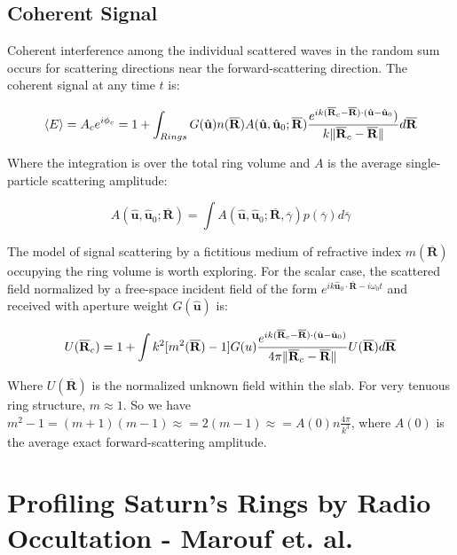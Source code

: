 \documentclass[oneside]{book}
\theoremstyle{mystyle}
\DeclarePairedDelimiter\norm{\lVert}{\rVert}
\begin{document}
\subsection{Coherent Signal}

Coherent interference among the individual scattered waves in the random sum occurs for scattering directions near the forward-scattering direction. The coherent signal at any time $t$ is:

\begin{equation}
\langle E \rangle = A_{c}e^{i\phi_{c}} = 1+\int_{Rings}G(\hat{\mathbf{u}})n(\overline{\mathbf{R}})A(\hat{\mathbf{u}},\hat{\mathbf{u}}_{0};\overline{\mathbf{R}})\frac{e^{ik(\overline{\mathbf{R}}_{c}-\overline{\mathbf{R}})\cdot(\hat{\mathbf{u}}-\hat{\mathbf{u}}_{0}})}{k\norm{\overline{\mathbf{R}}_{c}-\overline{\mathbf{R}}}}d\overline{\mathbf{R}}
\end{equation}

Where the integration is over the total ring volume and $A$ is the average single-particle scattering amplitude:

\begin{equation}
A(\hat{\mathbf{u}},\hat{\mathbf{u}}_{0};\overline{\mathbf{R}}) = \int A(\hat{\mathbf{u}},\hat{\mathbf{u}}_{0};\overline{\mathbf{R}},\overline{\gamma})p(\overline{\gamma})d\overline{\gamma}
\end{equation}

The model of signal scattering by a fictitious medium of refractive index $m(\overline{\mathbf{R}})$ occupying the ring volume is worth exploring. For the scalar case, the scattered field normalized by a free-space incident field of the form $e^{ik\hat{\mathbf{u}}_{0}\cdot \overline{\mathbf{R}}-i\omega_{0}t}$ and received with aperture weight $G(\hat{\mathbf{u}})$ is:

\begin{equation}
U(\overline{\mathbf{R}}_{c}) = 1+\int k^2[m^2(\overline{\mathbf{R}}) - 1]G(u)\frac{e^{ik(\overline{\mathbf{R}}_{c}-\overline{\mathbf{R}})\cdot(\hat{\mathbf{u}}-\hat{\mathbf{u}}_{0})}}{4\pi \norm{\overline{\mathbf{R}}_{c}-\overline{\mathbf{R}}}}U(\overline{\mathbf{R}})d\overline{\mathbf{R}}
\end{equation}

Where $U(\overline{\mathbf{R}})$ is the normalized unknown field within the slab. For very tenuous ring structure, $m\approx 1$. So we have $m^2-1 = (m+1)(m-1) \approx = 2(m-1) \approx = A(0)n\frac{4\pi}{k^3}$, where $A(0)$ is the average exact forward-scattering amplitude. 
%
\section{Profiling Saturn's Rings by Radio Occultation - Marouf et. al.}
\end{document}
